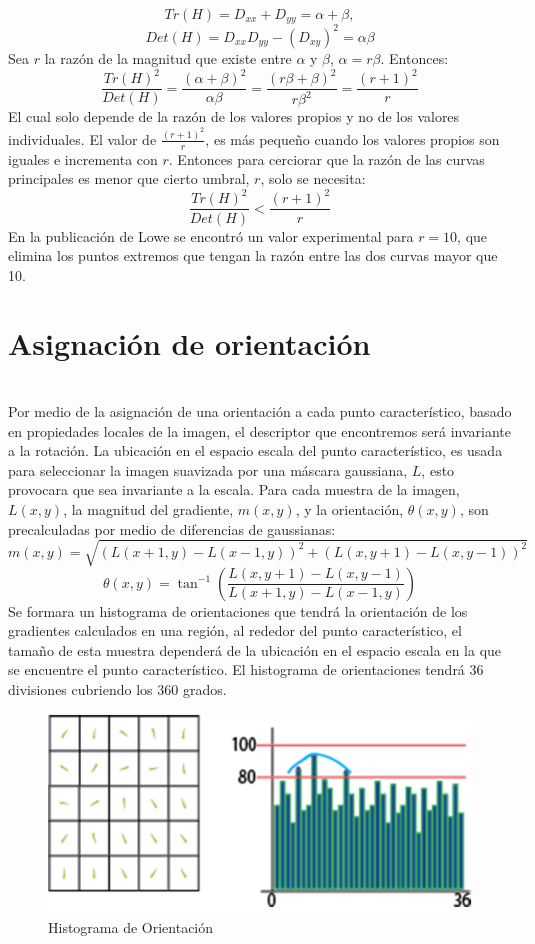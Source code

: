 		$$Tr(H) = D_{xx} + D_{yy} = \alpha+\beta,$$ $$Det(H) = D_{xx}D_{yy}-(D_{xy})^2= \alpha\beta$$
		Sea $r$ la razón de la magnitud que existe entre $\alpha$ y $\beta$, $\alpha = r\beta$. Entonces:
		$$\frac{Tr(H)^2}{Det(H)}= \frac{(\alpha+\beta)^2}{\alpha\beta}= \frac{(r\beta+\beta)^2}{r\beta^2}= \frac{(r+1)^2}{r}$$
		El cual solo depende de la razón de los valores propios y no de los valores individuales. El valor de $\frac{(r+1)^2}{r}$, es más pequeño cuando los valores propios son iguales e incrementa con $r$. Entonces para cerciorar que la razón de las curvas principales es menor que cierto umbral, $r$, solo se necesita:
		$$\frac{Tr(H)^2}{Det(H)} < \frac{(r+1)^2}{r}$$
		En la publicación de Lowe \cite{Lowe2004} se encontró un valor experimental para $r=10$, que elimina los puntos extremos que tengan la razón entre las dos curvas mayor que 10.
	
	
	\section{Asignación de orientación} \hfill \\
		Por medio de la asignación de una orientación a cada punto característico, basado en propiedades locales de la imagen, el descriptor que encontremos será invariante a la rotación. La ubicación en el espacio escala del punto característico, es usada para seleccionar la imagen suavizada por una máscara gaussiana, $L$, esto provocara que sea invariante a la escala. Para cada muestra de la imagen, $L(x,y)$, la magnitud del gradiente, $m(x,y)$, y la orientación, $\theta(x,y)$, son precalculadas por medio de diferencias de gaussianas:
  		$$m(x,y) = \sqrt{ (L(x+1,y)-L(x-1,y))^2 + (L(x,y+1)-L(x,y-1))^2 }$$		
		$$\theta(x,y) =  \tan^{-1} \left(\frac{L(x,y+1)-L(x,y-1)}{L(x+1,y)-L(x-1,y)}\right)$$
		Se formara un histograma de orientaciones que tendrá la orientación de los gradientes calculados en una región, al rededor del punto característico, el tamaño de esta muestra dependerá de la ubicación en el espacio escala en la que se encuentre el punto característico. El histograma de orientaciones tendrá 36 divisiones cubriendo los 360 grados.
		
		
		\begin{figure}[h]
			\centering
				\includegraphics[scale=0.7]{img/HistoOrientacion.png}
			\caption{Histograma de Orientación}
	\end{figure}
		

